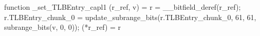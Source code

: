 function _set_TLBEntry_capl1 (r_ref, v) = {
    r = __bitfield_deref(r_ref);
    r.TLBEntry_chunk_0 = update_subrange_bits(r.TLBEntry_chunk_0, 61, 61, subrange_bits(v, 0, 0));
    (*r_ref) = r
}
